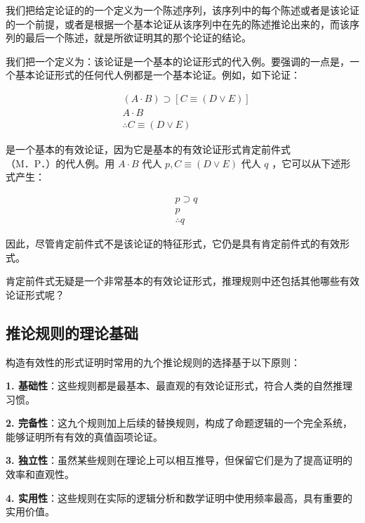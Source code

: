 \begin{theorembox}[title=形式证明的定义]
我们把给定论证的的一个定义为一个陈述序列，该序列中的每个陈述或者是该论证的一个前提，或者是根据一个基本论证从该序列中在先的陈述推论出来的，而该序列的最后一个陈述，就是所欲证明其的那个论证的结论。
\end{theorembox}

我们把一个定义为：该论证是一个基本的论证形式的代入例。要强调的一点是，一个基本论证形式的任何代人例都是一个基本论证。例如，如下论证：

$$
\begin{aligned}
& (A \cdot B) \supset[C \equiv(D \vee E)] \\
& A \cdot B \\
& \therefore C \equiv(D \vee E)
\end{aligned}
$$

是一个基本的有效论证，因为它是基本的有效论证形式肯定前件式\\
（M．P．）的代人例。用 $A \cdot B$ 代人 $p, C \equiv(D \vee E)$ 代人 $q$ ，它可以从下述形式产生：

$$
\begin{aligned}
& p \supset q \\
& p \\
& \therefore q
\end{aligned}
$$

因此，尽管肯定前件式不是该论证的特征形式，它仍是具有肯定前件式的有效形式。

肯定前件式无疑是一个非常基本的有效论证形式，推理规则中还包括其他哪些有效论证形式呢？

\subsection{推论规则的理论基础}

\begin{theorembox}[title=推论规则的选择原则]
构造有效性的形式证明时常用的九个推论规则的选择基于以下原则：

\textbf{1. 基础性}：这些规则都是最基本、最直观的有效论证形式，符合人类的自然推理习惯。

\textbf{2. 完备性}：这九个规则加上后续的替换规则，构成了命题逻辑的一个完全系统，能够证明所有有效的真值函项论证。

\textbf{3. 独立性}：虽然某些规则在理论上可以相互推导，但保留它们是为了提高证明的效率和直观性。

\textbf{4. 实用性}：这些规则在实际的逻辑分析和数学证明中使用频率最高，具有重要的实用价值。
\end{theorembox}

